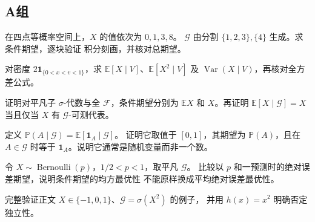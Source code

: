 \subsection*{A组}
\begin{enumerate}[label=\textbf{\thechapter.\arabic*.}]
在四点等概率空间上，$X$ 的值依次为 $0,1,3,8$。
$\mathcal G$ 由分割 $\{1,2,3\},\{4\}$ 生成。求条件期望，逐块验证
积分刻画，并核对总期望。

对密度 $2\mathbf1_{\{0<x<v<1\}}$，求
$\mathbb E[X\mid V]$、$\mathbb E[X^2\mid V]$ 及
$\operatorname{Var}(X\mid V)$，再核对全方差公式。

证明对平凡子 $\sigma$-代数与全 $\mathcal F$，条件期望分别为
$\mathbb EX$ 和 $X$。再证明
$\mathbb E[X\mid\mathcal G]=X$ 当且仅当 $X$ 有 $\mathcal G$-可测代表。

定义 $\mathbb P(A\mid\mathcal G)=\mathbb E[\mathbf1_A\mid\mathcal G]$。
证明它取值于 $[0,1]$，其期望为 $\mathbb P(A)$，且在 $A\in\mathcal G$
时等于 $\mathbf1_A$。说明它通常是随机变量而非一个数。

令 $X\sim\operatorname{Bernoulli}(p)$，$1/2<p<1$，取平凡 $\mathcal G$。
比较以 $p$ 和一预测时的绝对误差期望，说明条件期望的均方最优性
不能原样换成平均绝对误差最优性。

完整验证正文 $X\in\{-1,0,1\}$、$\mathcal G=\sigma(X^2)$ 的例子，
并用 $h(x)=x^2$ 明确否定独立性。
\end{enumerate}

